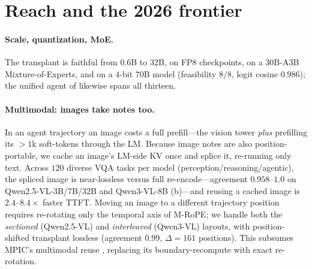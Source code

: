 \section{Reach and the 2026 frontier}
\label{sec:reach}

\paragraph{Scale, quantization, MoE.} The transplant is faithful from $0.6$B to $32$B, on FP8 checkpoints,
on a 30B-A3B Mixture-of-Experts, and on a $4$-bit $70$B model (feasibility $8/8$, logit cosine $0.986$);
the unified agent of  likewise spans all thirteen.

\paragraph{Multimodal: images take notes too.} In an agent trajectory an image costs a full prefill---the
vision tower \emph{plus} prefilling its ${>}1$k soft-tokens through the LM. Because image notes are also
position-portable, we cache an image's LM-side KV once and splice it, re-running only text. Across $120$
diverse VQA tasks per model (perception/reasoning/agentic), the spliced image is near-lossless versus full
re-encode---agreement $0.958$--$1.0$ on Qwen2.5-VL-3B/7B/32B and Qwen3-VL-8B (b)---and
reusing a cached image is $2.4$--$8.4\times$ faster TTFT. Moving an image to a different trajectory position
requires re-rotating only the temporal axis of M-RoPE; we handle both the \emph{sectioned} (Qwen2.5-VL)
and \emph{interleaved} (Qwen3-VL) layouts, with position-shifted transplant lossless (agreement $0.99$,
$\Delta{=}161$ positions). This subsumes MPIC's multimodal reuse \citep{mpic2025}, replacing its
boundary-recompute with exact re-rotation.

